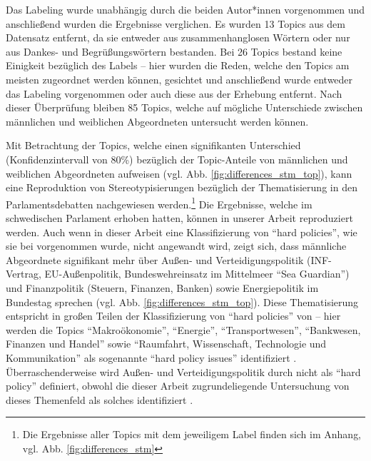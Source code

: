 \documentclass[12pt, 
    twoside=false, 
    bibliography=totoc, 
    numbers=endperiod, 
    headings=normal, 
    toc=chapterentrydotfill
    ]{scrbook}
\begin{document}
Das Labeling wurde unabhängig durch die beiden Autor*innen vorgenommen und anschließend wurden die Ergebnisse verglichen. Es wurden 13 Topics aus dem Datensatz entfernt, da sie entweder aus zusammenhanglosen Wörtern oder nur aus Dankes- und Begrüßungswörtern bestanden. Bei 26 Topics bestand keine Einigkeit bezüglich des Labels -- hier wurden die Reden, welche den Topics am meisten zugeordnet werden können, gesichtet und anschließend wurde entweder das Labeling vorgenommen oder auch diese aus der Erhebung entfernt. Nach dieser Überprüfung bleiben 85 Topics, welche auf mögliche Unterschiede zwischen männlichen und weiblichen Abgeordneten untersucht werden können.

Mit Betrachtung der Topics, welche einen signifikanten Unterschied (Konfidenzintervall von 80\%) bezüglich der Topic-Anteile von männlichen und weiblichen Abgeordneten aufweisen (vgl. Abb. \ref{fig:differences_stm_top}), kann eine Reproduktion von Stereotypisierungen bezüglich der Thematisierung in den Parlamentsdebatten nachgewiesen werden.\footnote{Die Ergebnisse aller Topics mit dem jeweiligem Label finden sich im Anhang, vgl. Abb. \ref{fig:differences_stm}} Die Ergebnisse, welche \textcite[501ff.]{back_2014} im schwedischen Parlament erhoben hatten, können in unserer Arbeit reproduziert werden. Auch wenn in dieser Arbeit eine Klassifizierung von \enquote{hard policies}, wie sie bei \citeauthor{back_2014} vorgenommen wurde, nicht angewandt wird, zeigt sich, dass männliche Abgeordnete signifikant mehr über Außen- und Verteidigungspolitik (INF-Vertrag, EU-Außenpolitik, Bundeswehreinsatz im Mittelmeer \enquote{Sea Guardian}) und Finanzpolitik (Steuern, Finanzen, Banken) sowie Energiepolitik im Bundestag sprechen (vgl. Abb. \ref{fig:differences_stm_top}). Diese Thematisierung entspricht in großen Teilen der Klassifizierung von \enquote{hard policies} von \citeauthor{back_2014} -- hier werden die Topics \enquote{Makroökonomie}, \enquote{Energie}, \enquote{Transportwesen}, \enquote{Bankwesen, Finanzen und Handel} sowie \enquote{Raumfahrt, Wissenschaft, Technologie und Kommunikation} als sogenannte \enquote{hard policy issues} identifiziert \parencite[510]{back_2014}. Überraschenderweise wird Außen- und Verteidigungspolitik durch \citeauthor{back_2014} nicht als \enquote{hard policy} definiert, obwohl die dieser Arbeit zugrundeliegende Untersuchung von \textcite{reynolds_1999} dieses Themenfeld als solches identifiziert \parencite[564]{reynolds_1999}.

\end{document}
